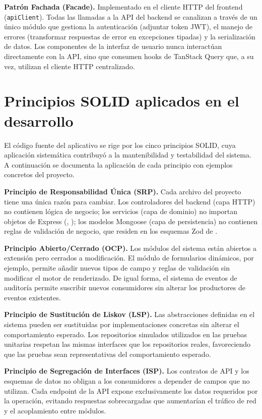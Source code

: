 \textbf{Patrón Fachada (Facade).} Implementado en el cliente HTTP del frontend (\texttt{apiClient}). Todas las llamadas a la API del backend se canalizan a través de un único módulo que gestiona la autenticación (adjuntar token JWT), el manejo de errores (transformar respuestas de error en excepciones tipadas) y la serialización de datos. Los componentes de la interfaz de usuario nunca interactúan directamente con la API, sino que consumen hooks de TanStack Query que, a su vez, utilizan el cliente HTTP centralizado.

\section{Principios SOLID aplicados en el desarrollo}
\label{sec:solid}

El código fuente del aplicativo se rige por los cinco principios SOLID, cuya aplicación sistemática contribuyó a la mantenibilidad y testabilidad del sistema. A continuación se documenta la aplicación de cada principio con ejemplos concretos del proyecto.

\textbf{Principio de Responsabilidad Única (SRP).} Cada archivo del proyecto tiene una única razón para cambiar. Los controladores del backend (capa HTTP) no contienen lógica de negocio; los servicios (capa de dominio) no importan objetos de Express (, ); los modelos Mongoose (capa de persistencia) no contienen reglas de validación de negocio, que residen en los esquemas Zod de .

\textbf{Principio Abierto/Cerrado (OCP).} Los módulos del sistema están abiertos a extensión pero cerrados a modificación. El módulo de formularios dinámicos, por ejemplo, permite añadir nuevos tipos de campo y reglas de validación sin modificar el motor de renderizado. De igual forma, el sistema de eventos de auditoría permite suscribir nuevos consumidores sin alterar los productores de eventos existentes.

\textbf{Principio de Sustitución de Liskov (LSP).} Las abstracciones definidas en el sistema pueden ser sustituidas por implementaciones concretas sin alterar el comportamiento esperado. Los repositorios simulados utilizados en las pruebas unitarias respetan las mismas interfaces que los repositorios reales, favoreciendo que las pruebas sean representativas del comportamiento esperado.

\textbf{Principio de Segregación de Interfaces (ISP).} Los contratos de API y los esquemas de datos no obligan a los consumidores a depender de campos que no utilizan. Cada endpoint de la API expone exclusivamente los datos requeridos por la operación, evitando respuestas sobrecargadas que aumentarían el tráfico de red y el acoplamiento entre módulos.

